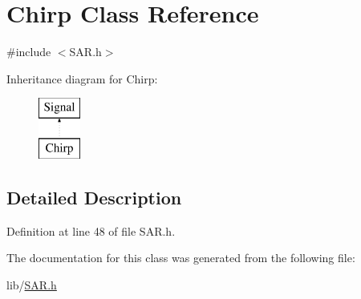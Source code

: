 \hypertarget{class_chirp}{}\section{Chirp Class Reference}
\label{class_chirp}


{\ttfamily \#include $<$S\+A\+R.\+h$>$}

Inheritance diagram for Chirp\+:\begin{figure}[H]
\begin{center}
\leavevmode
\includegraphics[height=2.000000cm]{class_chirp}
\end{center}
\end{figure}


\subsection{Detailed Description}


Definition at line 48 of file S\+A\+R.\+h.



The documentation for this class was generated from the following file\+:\begin{DoxyCompactItemize}
\item 
lib/\hyperlink{_s_a_r_8h}{S\+A\+R.\+h}\end{DoxyCompactItemize}
